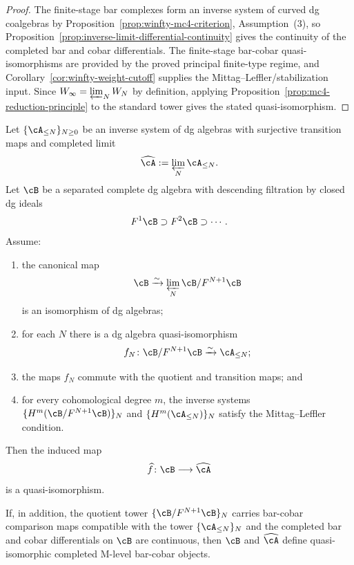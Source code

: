 \begin{proof}
The finite-stage bar complexes form an inverse system of curved dg
coalgebras by Proposition~\ref{prop:winfty-mc4-criterion},
Assumption~\textup{(3)}, so
Proposition~\ref{prop:inverse-limit-differential-continuity} gives the
continuity of the completed bar and cobar differentials.  The
finite-stage bar-cobar quasi-isomorphisms are provided by the proved
principal finite-type regime, and
Corollary~\ref{cor:winfty-weight-cutoff} supplies the
Mittag--Leffler/stabilization input.  Since
$W_\infty = \varprojlim_N W_N$ by definition, applying
Proposition~\ref{prop:mc4-reduction-principle} to the standard tower
gives the stated quasi-isomorphism.
\end{proof}

\begin{proposition}
\label{prop:completed-target-comparison}
Let $\{\cA_{\le N}\}_{N \ge 0}$ be an inverse system of dg algebras with
surjective transition maps and completed limit
\[
\widehat{\cA}:=\varprojlim_N \cA_{\le N}.
\]
Let $\cB$ be a separated complete dg algebra with descending filtration
by closed dg ideals
\[
F^1\cB \supset F^2\cB \supset \cdots.
\]
Assume:
\begin{enumerate}
\item the canonical map
  \[
  \cB \xrightarrow{\sim} \varprojlim_N \cB/F^{N+1}\cB
  \]
  is an isomorphism of dg algebras;
\item for each $N$ there is a dg algebra quasi-isomorphism
  \[
  f_N\colon \cB/F^{N+1}\cB \xrightarrow{\sim} \cA_{\le N};
  \]
\item the maps $f_N$ commute with the quotient and transition maps; and
\item for every cohomological degree $m$, the inverse systems
  $\{H^m(\cB/F^{N+1}\cB)\}_N$ and $\{H^m(\cA_{\le N})\}_N$ satisfy the
  Mittag--Leffler condition.
\end{enumerate}
Then the induced map
\[
\widehat f\colon \cB \longrightarrow \widehat{\cA}
\]
is a quasi-isomorphism.

If, in addition, the quotient tower $\{\cB/F^{N+1}\cB\}_N$ carries
bar-cobar comparison maps compatible with the tower
$\{\cA_{\le N}\}_N$ and the completed bar and cobar differentials on
$\cB$ are continuous, then $\cB$ and $\widehat{\cA}$ define
quasi-isomorphic completed M-level bar-cobar objects.
\end{proposition}

